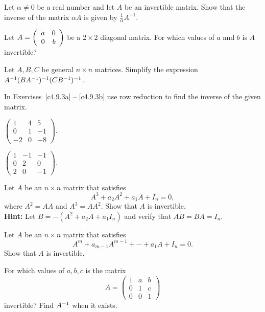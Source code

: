 \documentclass{ximera}
\begin{document}
\begin{exercise} \label{c4.8.2}
Let $\alpha \not=0$ be a real number and let $A$ be an invertible
matrix.  Show that the inverse of the matrix $\alpha A$ is given by
$\frac{1}{\alpha}A^{-1}$.
\end{exercise}

\begin{exercise} \label{c4.8.3}
Let $A=\left(\begin{array}{rr} a & 0\\ 0 &b\end{array}\right)$ be a $2\times 2$ diagonal matrix.
For which values of $a$ and $b$ is $A$ invertible?
\end{exercise}

\begin{exercise} \label{c4.8.4}
Let $A,B,C$ be general $n\times n$ matrices.  Simplify the expression
$A^{-1}(BA^{-1})^{-1}(CB^{-1})^{-1}$.
\end{exercise}

\noindent In Exercises~\ref{c4.9.3a} -- \ref{c4.9.3b} use row reduction
to find the inverse of the given matrix.
\begin{exercise} \label{c4.9.3a}
$\left(\begin{array}{rrr} 1 & 4 & 5\\ 0 & 1 & -1\\ -2 & 0 & -8
\end{array}\right)$.
\end{exercise}
\begin{exercise} \label{c4.9.3b}
$\left(\begin{array}{rrr} 1 & -1 & -1\\ 0 & 2 & 0\\ 2 & 0 & -1
\end{array}\right)$.
\end{exercise}

\begin{exercise} \label{c4.8.5}
Let $A$ be an $n\times n$ matrix that satisfies
\[
A^3 + a_2A^2 + a_1A + I_n = 0,
\]
where $A^2=AA$ and $A^3=AA^2$.  Show that $A$ is invertible. \\
{\bf Hint:}  Let $B = -(A^2+a_2A+a_1I_n)$ and verify that $AB=BA=I_n$.
\end{exercise}

\begin{exercise} \label{c4.8.6}
Let $A$ be an $n\times n$ matrix that satisfies
\[
A^m + a_{m-1}A^{m-1} + \cdots + a_1A + I_n = 0.
\]
Show that $A$ is invertible.
\end{exercise}

\begin{exercise} \label{c4.9.6}
For which values of $a,b,c$ is the matrix
\[
A =\left(\begin{array}{rrr} 1 & a & b\\ 0 & 1 & c\\ 0 & 0 & 1
\end{array}\right)
\]
invertible?  Find $A^{-1}$ when it exists.
\end{exercise}
\end{document}
